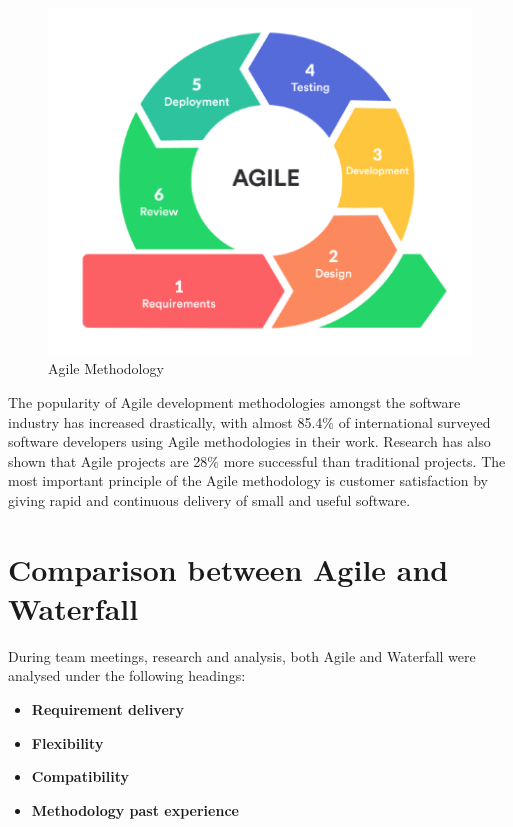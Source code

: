 \begin{figure}[ht]
    \centering
    \includegraphics[scale=0.8]{img/Agile.png}
    \caption{Agile Methodology}
    \label{fig:my_label1}
\end{figure}

The popularity of Agile development methodologies amongst the software industry has increased drastically, with almost 85.4\% of international surveyed software developers using Agile methodologies in their work. Research has also shown that Agile projects are 28\% more successful than traditional projects. The most important principle of the Agile methodology is customer satisfaction by giving rapid and continuous delivery of small and useful software.\cite{PopularityofAgile}



\section{Comparison between Agile and Waterfall}
During team meetings, research and analysis, both Agile and Waterfall were  analysed under the following headings:

\begin{itemize}

    \item \textbf{Requirement delivery}

    \item \textbf{Flexibility}

    \item \textbf{Compatibility}

     \item \textbf{Methodology past experience}

\end{itemize}

